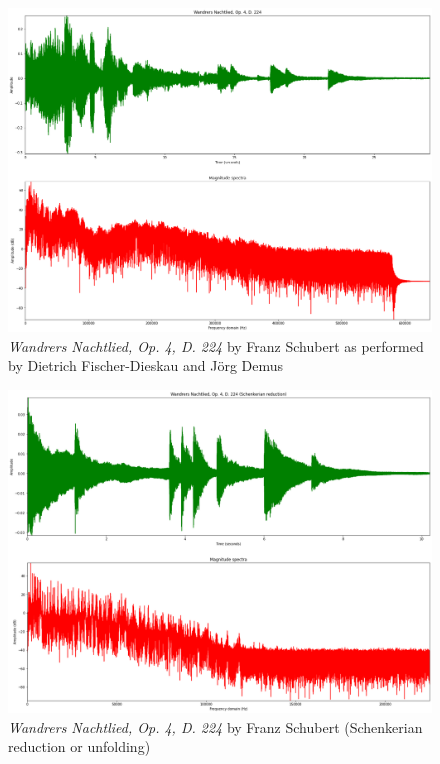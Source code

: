 \begin{figure}[!ht]
\includegraphics[clip,width=\columnwidth]{figures/schenkerian analysis/schubert.png}%
\caption{\textit{Wandrers Nachtlied, Op. 4, D. 224} by Franz Schubert as performed by Dietrich Fischer-Dieskau and Jörg Demus}
\label{fig:timeseries}
\end{figure}

\begin{figure}[!ht]
\includegraphics[clip,width=\columnwidth]{figures/schenkerian analysis/subert redu.png}%
\caption{\textit{Wandrers Nachtlied, Op. 4, D. 224} by Franz Schubert (Schenkerian reduction or unfolding)}
\label{fig:timeseries}
\end{figure}
